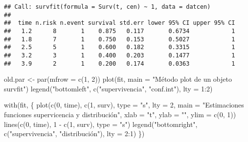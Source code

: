 \documentclass[
]{book}
\newenvironment{Shaded}{\begin{snugshade}}{\end{snugshade}}
\newcommand{\AttributeTok}[1]{\textcolor[rgb]{0.77,0.63,0.00}{#1}}
\newcommand{\DecValTok}[1]{\textcolor[rgb]{0.00,0.00,0.81}{#1}}
\newcommand{\FunctionTok}[1]{\textcolor[rgb]{0.00,0.00,0.00}{#1}}
\newcommand{\NormalTok}[1]{#1}
\newcommand{\OtherTok}[1]{\textcolor[rgb]{0.56,0.35,0.01}{#1}}
\newcommand{\SpecialCharTok}[1]{\textcolor[rgb]{0.00,0.00,0.00}{#1}}
\newcommand{\StringTok}[1]{\textcolor[rgb]{0.31,0.60,0.02}{#1}}
\theoremstyle{break}
\theoremstyle{definition}
\theoremstyle{definition}
\theoremstyle{definition}
\theoremstyle{definition}
\theoremstyle{remark}
\begin{document}
\begin{verbatim}
## Call: survfit(formula = Surv(t, cen) ~ 1, data = datcen)
## 
##  time n.risk n.event survival std.err lower 95% CI upper 95% CI
##   1.2      8       1    0.875   0.117       0.6734            1
##   1.8      7       1    0.750   0.153       0.5027            1
##   2.5      5       1    0.600   0.182       0.3315            1
##   3.2      3       1    0.400   0.203       0.1477            1
##   3.9      2       1    0.200   0.174       0.0363            1
\end{verbatim}

\begin{Shaded}
\begin{Highlighting}[]
\NormalTok{old.par }\OtherTok{\textless{}{-}} \FunctionTok{par}\NormalTok{(}\AttributeTok{mfrow =} \FunctionTok{c}\NormalTok{(}\DecValTok{1}\NormalTok{, }\DecValTok{2}\NormalTok{))}
\FunctionTok{plot}\NormalTok{(fit, }\AttributeTok{main =} \StringTok{"Método plot de un objeto \textquotesingle{}survfit\textquotesingle{}"}\NormalTok{)}
\FunctionTok{legend}\NormalTok{(}\StringTok{"bottomleft"}\NormalTok{,  }\FunctionTok{c}\NormalTok{(}\StringTok{"supervivencia"}\NormalTok{, }\StringTok{"conf.int"}\NormalTok{), }\AttributeTok{lty =} \DecValTok{1}\SpecialCharTok{:}\DecValTok{2}\NormalTok{)}

\FunctionTok{with}\NormalTok{(fit, \{}
  \FunctionTok{plot}\NormalTok{(}\FunctionTok{c}\NormalTok{(}\DecValTok{0}\NormalTok{, time), }\FunctionTok{c}\NormalTok{(}\DecValTok{1}\NormalTok{, surv), }\AttributeTok{type =} \StringTok{"s"}\NormalTok{, }\AttributeTok{lty =} \DecValTok{2}\NormalTok{,}
       \AttributeTok{main =} \StringTok{"Estimaciones funciones supervicencia y distribución"}\NormalTok{, }
       \AttributeTok{xlab =} \StringTok{"t"}\NormalTok{, }\AttributeTok{ylab =} \StringTok{""}\NormalTok{, }\AttributeTok{ylim =} \FunctionTok{c}\NormalTok{(}\DecValTok{0}\NormalTok{, }\DecValTok{1}\NormalTok{))}
  \FunctionTok{lines}\NormalTok{(}\FunctionTok{c}\NormalTok{(}\DecValTok{0}\NormalTok{, time), }\DecValTok{1} \SpecialCharTok{{-}} \FunctionTok{c}\NormalTok{(}\DecValTok{1}\NormalTok{, surv), }\AttributeTok{type =} \StringTok{"s"}\NormalTok{)}
  \FunctionTok{legend}\NormalTok{(}\StringTok{"bottomright"}\NormalTok{,  }\FunctionTok{c}\NormalTok{(}\StringTok{"supervivencia"}\NormalTok{, }\StringTok{"distribución"}\NormalTok{), }\AttributeTok{lty =} \DecValTok{2}\SpecialCharTok{:}\DecValTok{1}\NormalTok{)}
\NormalTok{\})}
\end{Highlighting}
\end{Shaded}
\end{document}
